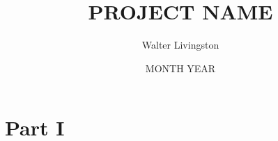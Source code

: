 \documentclass{report}
\title{PROJECT NAME}
\author{Walter Livingston}
\date{MONTH YEAR}
\begin{document}
\maketitle

\section*{Part I}


\nocite{*}


\end{document}
